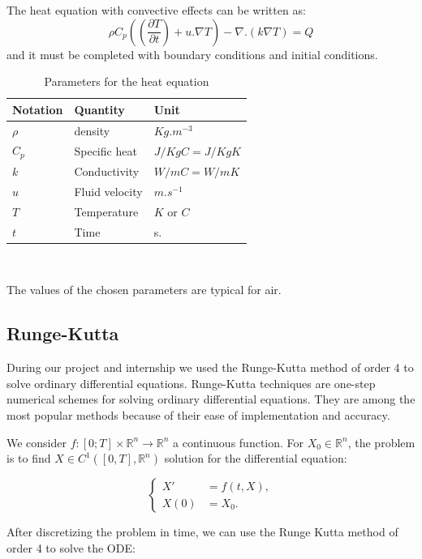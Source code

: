 \documentclass[12pt]{article}
\begin{document}
	\noindent The heat equation with convective effects can be written as:
    $$\rho C_p((\frac{\partial T}{\partial t})+u . \nabla T)-\nabla .(k \nabla T)=Q$$
    and it must be completed  with boundary conditions and initial conditions.
    \newline
	\begin{table}[H]
	\renewcommand{\arraystretch}{2}
    \begin{tabular}{|R{4cm}|C{4cm}|L{4cm}|}
    \hline
    Notation & Quantity &Unit  \\
    \hline
    $\rho$ & density & $Kg.m^
    {-3}$  \\[4cm]
    \hline
    $C_p$ & Specific heat & $J/KgC=J/KgK$ \\[4cm]
    \hline
    $k$ & Conductivity & $W/mC=W/mK$  \\[4cm]
    \hline
    $u$ & Fluid velocity & $m.s^{-1}$  \\[4cm]
    \hline
    $T$ & Temperature & $K$ or $C$   \\[4cm]
    \hline
    $t$ & Time & s.    \\[4cm]
    \hline
\end{tabular}
\\[10pt]
\caption{Parameters for the heat equation}
\end{table}
\noindent The values of the chosen parameters are typical for air.

	\newpage

    \subsection{Runge-Kutta}
    \label{rk4}
    \noindent During our project and internship we used the Runge-Kutta method of order 4 to solve ordinary differential equations. Runge-Kutta techniques are one-step numerical schemes for solving ordinary differential equations. They are among the most popular methods because of their ease of implementation and accuracy.
    
    \noindent We consider $f : [0; T] \times \mathbb{R}^n \rightarrow \mathbb{R}^n$ a continuous function. For $X_0\in \mathbb{R}^n$, the problem is to find  $X\in C^1([0,T],\mathbb{R}^n)$ solution for the differential equation:
	
	$$\left\{\begin{aligned}
		X'&=f(t,X), \\
		X(0)&=X_0.
	\end{aligned}\right.$$
	
	
	 \noindent After discretizing the problem in time, we can use the Runge Kutta method of order 4 to solve the ODE:
		
\end{document}
